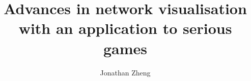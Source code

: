 \documentclass[a4paper,12pt,twoside]{report}
\begin{document}
\title{\LARGE {\bf Advances in network visualisation with an application to serious games}\\
 \vspace*{6mm}
}

\author{Jonathan Zheng}

\normallinespacing
\maketitle

\preface
% 
% 
% 
% 

\body
% 


% 
% 


\printbibliography
\end{document}
